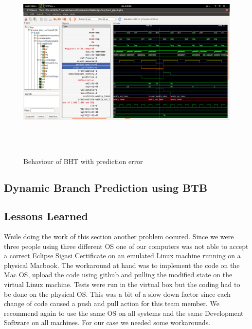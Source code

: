 \begin{figure}
	\centering
	\includegraphics[width=1\textwidth, height=10cm, keepaspectratio]{pictures/BHT_BranchTakenPred0Err1}
	\caption{Behaviour of BHT with prediction error}
	\label{fig5-2}
\end{figure}




\subsection{Dynamic Branch Prediction using BTB}

\subsection{Lessons Learned}
Wnile doing the work of this section another problem occured. Since we were three people using three different OS one of our computers was not able to accept a correct Eclipse Sigasi Certificate on an emulated Linux machine running on a physical Macbook. The workaround at hand was to implement the code on the Mac OS, upload the code using github and pulling the modified  state on the virtual Linux machine. Tests were run in the virtual box but the coding had to be done on the physical OS. This was a bit of a slow down factor since each change of code caused a push and pull action for this team member. We recommend again to use the same OS on all systems and the same Development Software on all machines. For our case we needed some workarounds.
